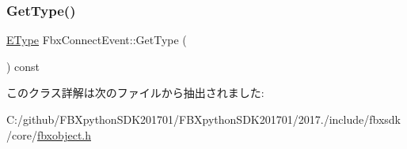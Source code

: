 \mbox{\label{class_fbx_connect_event_ac49976c7e8383896a63ff1e582e0ee2b}} 
\subsubsection{\texorpdfstring{Get\+Type()}{GetType()}}
{\footnotesize\ttfamily \hyperlink{class_fbx_connect_event_aa5471711f7e440a5a236ed06b08bf1d7}{E\+Type} Fbx\+Connect\+Event\+::\+Get\+Type (\begin{DoxyParamCaption}{ }\end{DoxyParamCaption}) const}



このクラス詳解は次のファイルから抽出されました\+:\begin{DoxyCompactItemize}
\item 
C\+:/github/\+F\+B\+Xpython\+S\+D\+K201701/\+F\+B\+Xpython\+S\+D\+K201701/2017./include/fbxsdk/core/\hyperlink{fbxobject_8h}{fbxobject.\+h}\end{DoxyCompactItemize}
